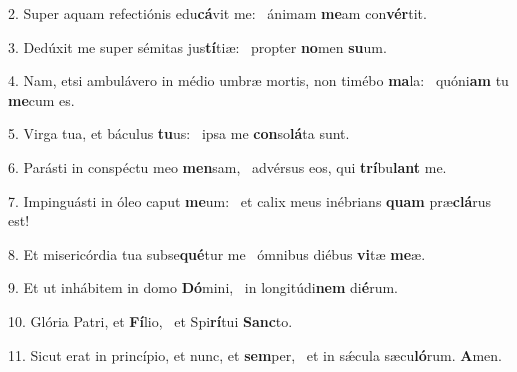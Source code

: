 2. Super aquam refectiónis edu\textbf{cá}vit me: \ast\  ánimam \textbf{me}am con\textbf{vér}tit.\

3. Dedúxit me super sémitas jus\textbf{tí}tiæ: \ast\  propter \textbf{no}men \textbf{su}um.\

4. Nam, etsi ambulávero in médio umbræ mortis, non timébo \textbf{ma}la: \ast\  quóni\textbf{am} tu \textbf{me}cum es.\

5. Virga tua, et báculus \textbf{tu}us: \ast\  ipsa me \textbf{con}so\textbf{lá}ta sunt.\

6. Parásti in conspéctu meo \textbf{men}sam, \ast\  advérsus eos, qui \textbf{trí}bu\textbf{lant} me.\

7. Impinguásti in óleo caput \textbf{me}um: \ast\  et calix meus inébrians \textbf{quam} præ\textbf{clá}rus est!\

8. Et misericórdia tua subse\textbf{qué}tur me \ast\  ómnibus diébus \textbf{vi}tæ \textbf{me}æ.\

9. Et ut inhábitem in domo \textbf{Dó}mini, \ast\  in longitúdi\textbf{nem} di\textbf{é}rum.\

10. Glória Patri, et \textbf{Fí}lio, \ast\  et Spi\textbf{rí}tui \textbf{Sanc}to.\

11. Sicut erat in princípio, et nunc, et \textbf{sem}per, \ast\  et in sǽcula sæcu\textbf{ló}rum. \textbf{A}men.\

